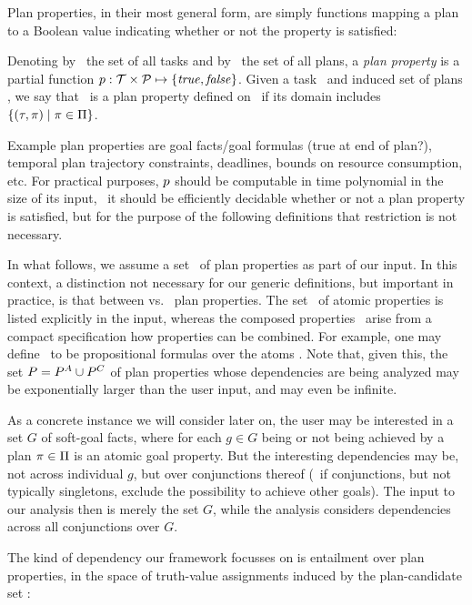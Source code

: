 Plan properties, in their most general form, are simply functions
mapping a plan to a Boolean value indicating whether or not the
property is satisfied:

\begin{definition}
Denoting by \alltasks\ the set of all tasks and by \allplans\ the set
of all plans, a \emph{plan property} is a partial function $p :
\cal T \times \cal P \mapsto \{\mathit{true}, \mathit{false}\}$. Given a task
\task\ and induced set of plans \plans, we say that \prop\ is a plan
property defined on \task\ if its domain includes $\{(\tau,\pi) \mid \pi
\in \Pi\}$.
\end{definition}

Example plan properties are goal facts/goal formulas (true at end of
plan?), temporal plan trajectory constraints, deadlines, bounds on
resource consumption, etc. For practical purposes, $p$ should be
computable in time polynomial in the size of its input, \ie\ it should
be efficiently decidable whether or not a plan property is satisfied,
but for the purpose of the following definitions that restriction is
not necessary.

In what follows, we assume a set \props\ of plan properties as part of
our input. In this context, a distinction not necessary for our
generic definitions, but important in practice, is that between
 vs.\  plan properties. The set
\propsatom\ of atomic properties is listed explicitly in the input,
whereas the composed properties \propscomp\ arise from a compact
specification how properties can be combined. For example, one may
define \propscomp\ to be propositional formulas over the atoms
\propsatom. Note that, given this, the set $P = P^A \cup
P^C$ of plan properties whose dependencies are being analyzed
may be exponentially larger than the user input, and may even be
infinite.

As a concrete instance we will consider later on, the user may be
interested in a set $G$ of soft-goal facts, where for each $g \in G$
being or not being achieved by a plan $\pi \in \Pi$ is an atomic
goal property. But the interesting dependencies may be, not across
individual $g$, but over conjunctions thereof (\eg\ if conjunctions,
but not typically singletons, exclude the possibility to achieve other
goals). The input to our analysis then is merely the set $G$, while
the analysis considers dependencies across all conjunctions over $G$.

The kind of dependency our framework focusses on is entailment over
plan properties, in the space of truth-value assignments induced by
the plan-candidate set \plans:

